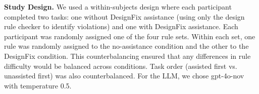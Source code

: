 \documentclass[conference]{IEEEtran}
\begin{document}

\textbf{Study Design.} We used a within-subjects design where each participant completed two tasks: one without DesignFix assistance (using only the design rule checker to identify violations) and one with DesignFix assistance. Each participant was randomly assigned one of the four rule sets. Within each set, one rule was randomly assigned to the no-assistance condition and the other to the DesignFix condition. This counterbalancing ensured that any differences in rule difficulty would be balanced across conditions. Task order (assisted first vs. unassisted first) was also counterbalanced. For the LLM, we chose gpt-4o-nov with temperature 0.5.
\end{document}
